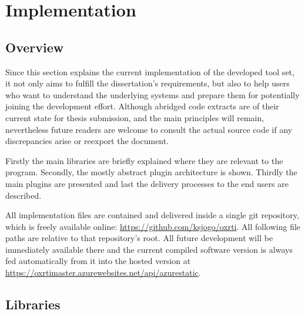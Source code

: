 \section{Implementation}

\subsection{Overview}
Since this section explains the current implementation of the developed tool set, it
not only aims to fulfill the dissertation's requirements, but also to help users
who want to understand the underlying systems and
prepare them for potentially joining the development effort. Although abridged code
extracts are of their current state for thesis submission, and the main
principles will remain, nevertheless future readers are welcome to consult the actual
source code if any discrepancies arise or reexport the document.

Firstly  the main libraries are briefly explained where they are relevant to the
program. Secondly, the mostly abstract plugin architecture is shown. Thirdly the main plugins are presented and last the
delivery processes to the end users are described.


All implementation files are contained and delivered inside a single git
repository, which is freely available online:
\url{https://github.com/ksjogo/oxrti}.
All following file paths are relative to that repository's root. All future development will
be immediately available there and the current compiled software version is
always fed automatically from it into the hosted version at \url{https://oxrtimaster.azurewebsites.net/api/azurestatic}.

\subsection{Libraries}
